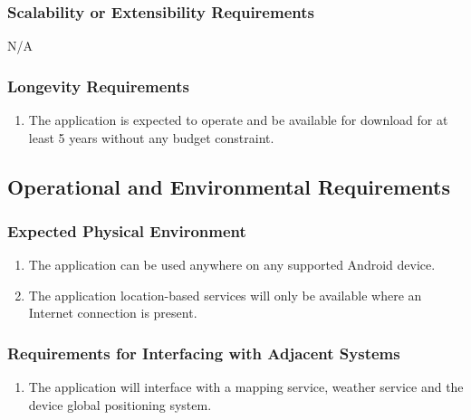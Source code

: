 \documentclass[titlepage]{article}
\newcounter{myCounter}
\begin{document}
\subsubsection{Scalability or Extensibility Requirements}
\label{ssub:scalability_or_extensibility_requirements}
N/A

\subsubsection{Longevity Requirements}
\label{ssub:longevity_requirements}
\begin{enumerate}[{PR}1. ]
    \setcounter{enumi}{\themyCounter}
    \item The application is expected to operate and be available for download for at least 5 years
    without any budget constraint.
    \setcounter{myCounter}{\theenumi}
\end{enumerate}


\subsection{Operational and Environmental Requirements}
\label{sub:operational_and_environmental_requirements}
\setcounter{myCounter}{0}

\subsubsection{Expected Physical Environment}
\label{ssub:expected_physical_environment}
\begin{enumerate}[{OE}1. ]
    \setcounter{enumi}{\themyCounter}
	\item The application can be used anywhere on any supported Android device.
    \item The application location-based services will only be available where an Internet
    connection is present.
    \setcounter{myCounter}{\theenumi}
\end{enumerate}

\subsubsection{Requirements for Interfacing with Adjacent Systems}
\label{ssub:requirements_for_interfacing_with_adjacent_systems}
\begin{enumerate}[{OE}1. ]
    \setcounter{enumi}{\themyCounter}
    \item The application will interface with a mapping service, weather service and the device
    global positioning system.
    \setcounter{myCounter}{\theenumi}
\end{enumerate}
\end{document}
